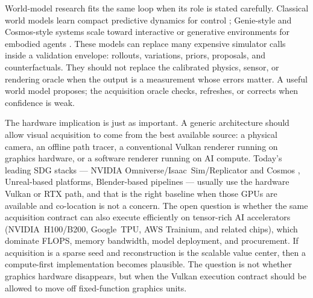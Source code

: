 \documentclass[10pt,journal,onecolumn]{IEEEtran}
\begin{document}
World-model research fits the same loop when its role is stated carefully.
Classical world models learn compact predictive dynamics for control
\cite{ha2018}; Genie-style and Cosmos-style systems scale toward interactive or
generative environments for embodied agents
\cite{bruce2024,deepmind2024genie2,nvidia2024cosmos}. These models can replace
many expensive simulator calls inside a validation envelope: rollouts,
variations, priors, proposals, and counterfactuals. They should not replace the
calibrated physics, sensor, or rendering oracle when the output is a measurement
whose errors matter. A useful world model proposes; the acquisition oracle
checks, refreshes, or corrects when confidence is weak.

The hardware implication is just as important. A generic architecture should
allow visual acquisition to come from the best available source: a physical
camera, an offline path tracer, a conventional Vulkan renderer running on
graphics hardware, or a software renderer running on AI compute. Today's leading
SDG stacks --- NVIDIA Omniverse\slash Isaac~Sim\slash Replicator and Cosmos
\cite{nvidia2024cosmos}, Unreal-based platforms, Blender-based pipelines
\cite{denninger2019blenderproc,greff2022kubric} --- usually use the hardware
Vulkan or RTX path, and that is the right baseline when those GPUs are available
and co-location is not a concern. The open question is whether the same
acquisition contract can also execute efficiently on tensor-rich AI accelerators
(NVIDIA~H100\slash B200, Google~TPU, AWS Trainium, and related chips), which
dominate FLOPS, memory bandwidth, model deployment, and procurement. If
acquisition is a sparse seed and reconstruction is the scalable value center,
then a compute-first implementation becomes plausible. The question is not
whether graphics hardware disappears, but when the Vulkan execution contract
should be allowed to move off fixed-function graphics units.
\end{document}
